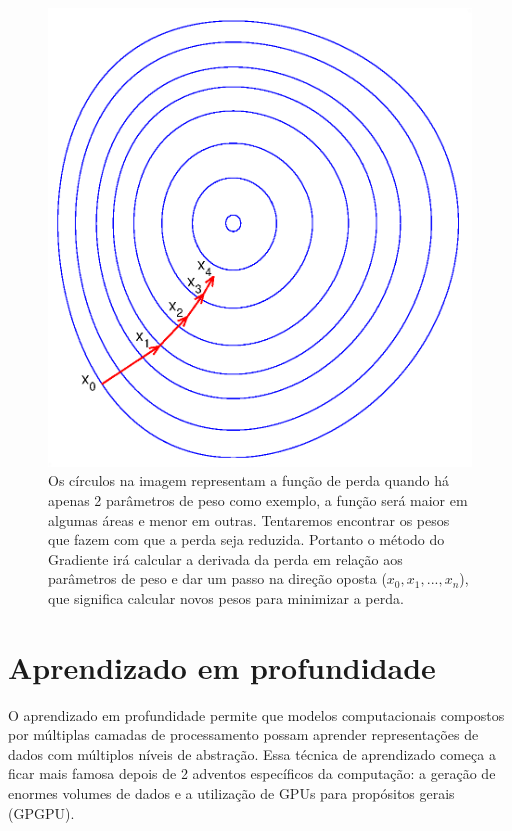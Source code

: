 \begin{figure}[H]
\centering
\includegraphics[scale=0.6]{imagens/Gradient_descent.eps}
\caption{Os círculos na imagem representam a função de perda quando há
  apenas 2 parâmetros de peso como exemplo, a função será maior em
  algumas áreas e menor em outras. Tentaremos encontrar os pesos que
  fazem com que a perda seja reduzida. Portanto o método do Gradiente
  irá calcular a derivada da perda em relação aos parâmetros de peso e
  dar um passo na direção oposta ($x_0,x_1,...,x_n$), que significa
  calcular novos pesos para minimizar a perda.}
\label{fig:gradient_descent}
\end{figure}

\section{Aprendizado em profundidade}

O aprendizado em profundidade permite que modelos computacionais
compostos por múltiplas camadas de processamento possam aprender
representações de dados com múltiplos níveis de abstração\cite{LeCun}.
Essa técnica de aprendizado começa a ficar mais famosa depois de 2
adventos específicos da computação: a geração de enormes volumes de
dados e a utilização de GPUs para propósitos gerais (GPGPU).

